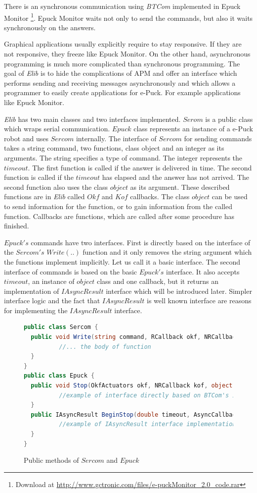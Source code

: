   There is an synchronous communication using {\it BTCom} implemented in Epuck Monitor
  \footnote{\small{Download at \url{http://www.gctronic.com/files/e-puckMonitor_2.0_code.rar}}}. 
  Epuck Monitor waits not only to send the commands, but also it waits synchronously on the answers.
   
  Graphical applications usually explicitly require to stay responsive. 
  If they are not responsive, they freeze like Epuck Monitor.
  On the other hand, asynchronous programming is much more complicated than synchronous programming.
  The goal of {\it Elib} is to hide the complications of APM and offer an interface
  which performs sending and receiving messages asynchronously and
  which allows a programmer to easily create applications for e-Puck. For example applications like Epuck Monitor.
   
  {\it Elib} has two main classes and two interfaces implemented.
  $Serom$ is a public class which wraps serial communication.
  $Epuck$ class represents an instance of a e-Puck robot and uses $Sercom$ internally.
  The interface of $Sercom$ for sending commands takes a
  string command, two functions, class object and an integer as its arguments.
  The string specifies a type of command. The integer represents the $timeout$.
  The first function is called if the answer is delivered in time.
  The second function is called if the $timeout$ has elapsed and the answer has not arrived.
  The second function also uses the class $object$ as its argument.  These described
  functions are in {\it Elib} called $Okf$ and $Kof$ callbacks. The class $object$
  can be used to send information for the function, or to gain information from the called function.
  Callbacks are functions, which are called after some procedure has finished.

  $Epuck's$ commands have two interfaces. First is directly based on the interface of 
  the $Sercom's$ $Write(..)$ function and it only removes the string argument which the functions
  implement implicitly.
  Let us call it a basic interface.
  The second interface of commands is based on the basic $Epuck's$ interface. 
  It also accepts $timeout$, an instance of $object$ class and one callback, but it returns 
  an implementation of $IAsyncResult$ interface which will be introduced later.
  Simpler interface logic	and the fact that $IAsyncResult$ is well known interface
  are reasons for implementing the $IAsyncResult$ interface.

\begin{figure}[!hbp]
\begin{lstlisting}[language=cs]
public class Sercom {
  public void Write(string command, RCallback okf, NRCallback kof,object state, double timeout) {
          //... the body of function
  }
}
public class Epuck {
  public void Stop(OkfActuators okf, NRCallback kof, object state, double timeout) {
          //example of interface directly based on BTCom's interface
  }
  public IAsyncResult BeginStop(double timeout, AsyncCallback callback, Object state) {
          //example of IAsyncResult interface implementation
  }
}
\end{lstlisting}
\caption{Public methods of $Sercom$ and $Epuck$} \label{serep}
\end{figure}
